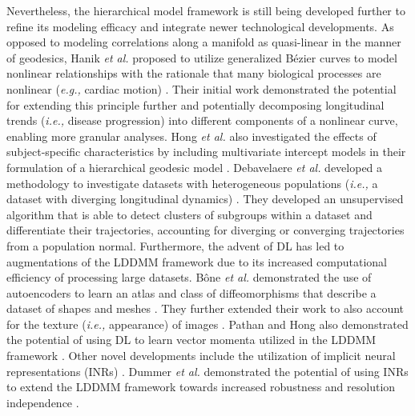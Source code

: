 					Nevertheless, the hierarchical model framework is still being developed further to refine its modeling efficacy and integrate newer technological developments. As opposed to modeling correlations along a manifold as quasi-linear in the manner of geodesics, Hanik \textit{et al.} proposed to utilize generalized Bézier curves to model nonlinear relationships with the rationale that many biological processes are nonlinear (\textit{e.g.,} cardiac motion) \cite{Hanik2022}. Their initial work demonstrated the potential for extending this principle further and potentially decomposing longitudinal trends (\textit{i.e.,} disease progression) into different components of a nonlinear curve, enabling more granular analyses. Hong \textit{et al.} also investigated the effects of subject-specific characteristics by including multivariate intercept models in their formulation of a hierarchical geodesic model \cite{Hong2019}. Debavelaere \textit{et al.} developed a methodology to investigate datasets with heterogeneous populations (\textit{i.e.,} a dataset with diverging longitudinal dynamics) \cite{Debavelaere2020}. They developed an unsupervised algorithm that is able to detect clusters of subgroups within a dataset and differentiate their trajectories, accounting for diverging or converging trajectories from a population normal. Furthermore, the advent of DL has led to augmentations of the LDDMM framework due to its increased computational efficiency of processing large datasets\cite{Yang2023, BenAmor2022}. Bône \textit{et al.} demonstrated the use of autoencoders to learn an atlas and class of diffeomorphisms that describe a dataset of shapes and meshes \cite{Bne2019}. They further extended their work to also account for the texture (\textit{i.e.,} appearance) of images \cite{Bne2020a}. Pathan and Hong also demonstrated the potential of using DL to learn vector momenta utilized in the LDDMM framework \cite{pathan2018}. Other novel developments include the utilization of implicit neural representations (INRs) \cite{NEURIPS2020_53c04118}. Dummer \textit{et al.} demonstrated the potential of using INRs to extend the LDDMM framework towards increased robustness and resolution independence \cite{dummer2023}. 
				
